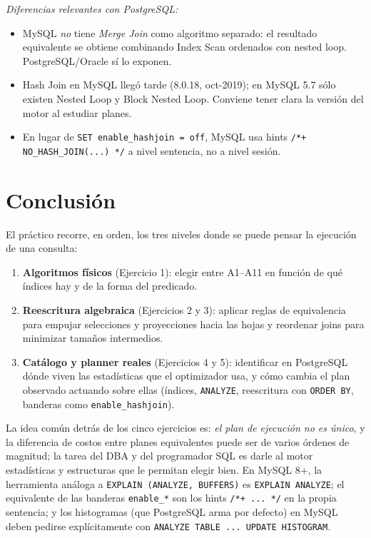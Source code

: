 \documentclass[11pt,a4paper]{article}
\begin{document}
\textit{Diferencias relevantes con PostgreSQL:}

\begin{itemize}
    \item MySQL \emph{no} tiene \emph{Merge Join} como algoritmo separado: el resultado equivalente se obtiene combinando Index Scan ordenados con nested loop. PostgreSQL/Oracle sí lo exponen.
    \item Hash Join en MySQL llegó tarde (8.0.18, oct-2019); en MySQL 5.7 sólo existen Nested Loop y Block Nested Loop. Conviene tener clara la versión del motor al estudiar planes.
    \item En lugar de \texttt{SET enable\_hashjoin = off}, MySQL usa hints \texttt{/*+ NO\_HASH\_JOIN(...) */} a nivel sentencia, no a nivel sesión.
\end{itemize}

\section*{Conclusión}

El práctico recorre, en orden, los tres niveles donde se puede pensar la ejecución de una consulta:

\begin{enumerate}
    \item \textbf{Algoritmos físicos} (Ejercicio 1): elegir entre A1--A11 en función de qué índices hay y de la forma del predicado.
    \item \textbf{Reescritura algebraica} (Ejercicios 2 y 3): aplicar reglas de equivalencia para empujar selecciones y proyecciones hacia las hojas y reordenar joins para minimizar tamaños intermedios.
    \item \textbf{Catálogo y planner reales} (Ejercicios 4 y 5): identificar en PostgreSQL dónde viven las estadísticas que el optimizador usa, y cómo cambia el plan observado actuando sobre ellas (índices, \texttt{ANALYZE}, reescritura con \texttt{ORDER BY}, banderas como \texttt{enable\_hashjoin}).
\end{enumerate}

La idea común detrás de los cinco ejercicios es: \emph{el plan de ejecución no es único}, y la diferencia de costos entre planes equivalentes puede ser de varios órdenes de magnitud; la tarea del DBA y del programador SQL es darle al motor estadísticas y estructuras que le permitan elegir bien. En MySQL 8+, la herramienta análoga a \texttt{EXPLAIN (ANALYZE, BUFFERS)} es \texttt{EXPLAIN ANALYZE}; el equivalente de las banderas \texttt{enable\_*} son los hints \texttt{/*+ ... */} en la propia sentencia; y los histogramas (que PostgreSQL arma por defecto) en MySQL deben pedirse explícitamente con \texttt{ANALYZE TABLE ... UPDATE HISTOGRAM}.
\end{document}
